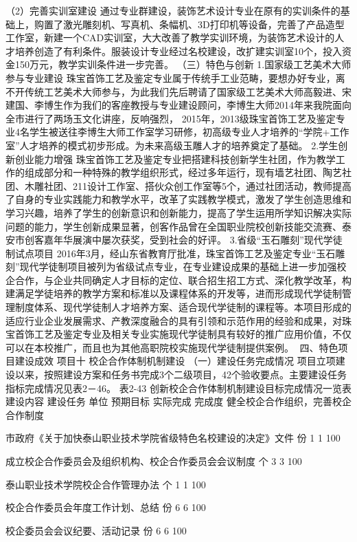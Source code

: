 （2）完善实训室建设
通过专业群建设，装饰艺术设计专业在原有的实训条件的基础上，购置了激光雕刻机、写真机、条幅机、3D打印机等设备，完善了产品造型工作室，新建一个CAD实训室，大大改善了教学实训环境，为装饰艺术设计的人才培养创造了有利条件。服装设计专业经过名校建设，改扩建实训室10个，投入资金150万元，教学实训条件进一步完善。
（三）特色与创新
1.国家级工艺美术大师参与专业建设
珠宝首饰工艺及鉴定专业属于传统手工业范畴，要想办好专业，离不开传统工艺美术大师参与，为此我们先后聘请了国家级工艺美术大师高毅进、宋建国、李博生作为我们的客座教授与专业建设顾问，李博生大师2014年来我院面向全市进行了两场玉文化讲座，反响强烈， 2015年，2013级珠宝首饰工艺及鉴定专业4名学生被送往李博生大师工作室学习研修，初高级专业人才培养的“学院+工作室”人才培养的模式初步形成。为未来高级玉雕人才的培养奠定了基础。
2.学生创新创业能力增强
珠宝首饰工艺及鉴定专业把搭建科技创新学生社团，作为教学工作的组成部分和一种特殊的教学组织形式，经过多年运行，现有墙艺社团、陶艺社团、木雕社团、211设计工作室、搭伙众创工作室等5个，通过社团活动，教师提高了自身的专业实践能力和教学水平，改革了实践教学模式，激发了学生创造思维和学习兴趣，培养了学生的创新意识和创新能力，提高了学生运用所学知识解决实际问题的能力，学生创新成果显著，创客作品曾在全国职业院校创新技能交流赛、泰安市创客嘉年华展演中屡次获奖，受到社会的好评。
3.省级“玉石雕刻”现代学徒制试点项目
2016年3月，经山东省教育厅批准，珠宝首饰工艺及鉴定专业“玉石雕刻”现代学徒制项目被列为省级试点专业，在专业建设成果的基础上进一步加强校企合作，与企业共同确定人才目标的定位、联合招生招工方式、深化教学改革，构建满足学徒培养的教学方案和标准以及课程体系的开发等，进而形成现代学徒制管理制度体系、现代学徒制人才培养方案、适合现代学徒制的课程等。本项目形成的适应行业企业发展需求、产教深度融合的具有引领和示范作用的经验和成果，对珠宝首饰工艺及鉴定专业及相关专业实施现代学徒制具有较好的推广应用价值，不仅可以在本校推广，而且也为其他高职院校实施现代学徒制提供案例。

四、特色项目建设成效
项目十    校企合作体制机制建设
（一）建设任务完成情况
项目立项建设以来，按照建设方案和任务书完成3个二级项目，42个验收要点。主要建设任务指标完成情况见表2－46。
表2-43  创新校企合作体制机制建设目标完成情况一览表
建设内容
建设任务
单位
预期目标
实际完成
完成度
健全校企合作组织，完善校企合作制度

市政府《关于加快泰山职业技术学院省级特色名校建设的决定》文件
份
1
1
100%

成立校企合作委员会及组织机构、校企合作委员会会议制度
个
3
3
100%

泰山职业技术学院校企合作管理办法
个
1
1
100%

校企合作委员会年度工作计划、总结
份
6
6
100%

校企委员会会议纪要、活动记录
份
6
6
100%

